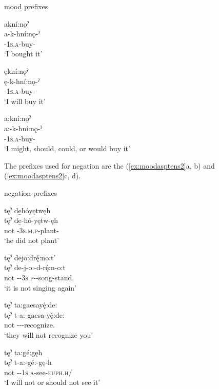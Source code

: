 \ea\label{ex:moodasptens1} mood prefixes

\ea akní:nǫˀ\\\label{ex:moodasptens1a}
\gll a-k-hní:nǫ-ˀ\\
{\factual}-\textsc{1s.a}-buy-{\punctual}\\
\glt `I bought it'

\ex ękní:nǫˀ\\\label{ex:moodasptens1b}
\gll ę-k-hní:nǫ-ˀ\\
\fut-\textsc{1s.a}-buy-{\punctual}\\
\glt `I will buy it'

\ex a:kní:nǫˀ\\\label{ex:moodasptens1c}
\gll a:-k-hní:nǫ-ˀ\\
{\indefinite}-\textsc{1s.a}-buy-{\punctual}\\
\glt `I might, should, could, or would buy it'
\z
\z

The prefixes used for negation are the  {\negative} (\ref{ex:moodasptens2}a, b) and  {\contrastive} (\ref{ex:moodasptens2}c, d). 

\ea\label{ex:moodasptens2} negation prefixes

\ea tęˀ de̱hóyętwęh\\
\gll tęˀ de̱-hó-yętw-ęh\\
not {\negative}-\textsc{3s.m.p}-plant-{\stative}\\
\glt ‘he did not plant’

\ex tęˀ dejo:drę́:no:t’\\
\gll tęˀ de-j-o:-d-rę́:n-o:t\\
not {\negative}-{\repetitive}-\textsc{3s.p}-{\semireflexive}-song-stand.{\stative}\\
\glt  ‘it is not singing again’

\ex tęˀ ta:gaesayę́:de: \\
\gll tęˀ t-a:-gaesa-yę́:de:\\
not {\contrastive}-{\indefinite}--recognize.{\noaspect}\\
\glt ‘they will not recognize you’

\ex tęˀ ta:gé:gęh \\
\gll tęˀ t-a:-gé:-gę-h\\
not {\contrastive}-{\indefinite}-\textsc{1s.a}-see-\textsc{euph.h}/{\noaspect}\\
\glt ‘I will not or should not see it’
\z
\z

\largerpage[2]
